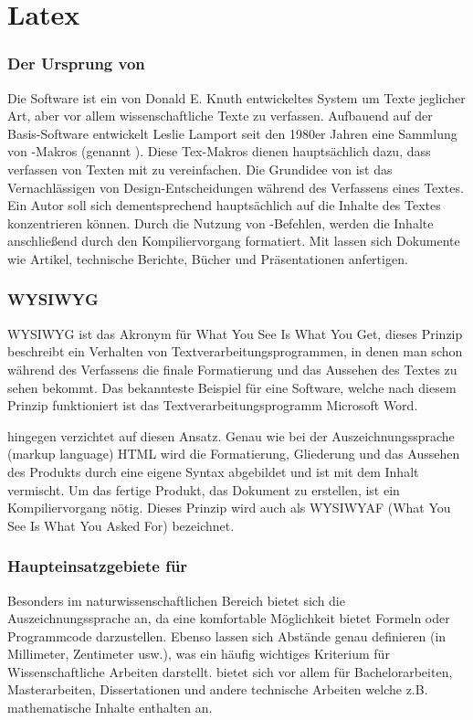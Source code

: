 \part{Latex}
    \section{Der Ursprung von \latex}
    Die Software \tex ist ein von Donald E. Knuth entwickeltes System um Texte jeglicher Art, aber vor allem wissenschaftliche Texte zu verfassen. Aufbauend auf der Basis-Software \tex entwickelt Leslie Lamport seit den 1980er Jahren eine Sammlung von \tex-Makros (genannt \latex). Diese Tex-Makros dienen hauptsächlich dazu, dass verfassen von Texten mit \tex zu vereinfachen. Die Grundidee von \latex ist das Vernachlässigen von Design-Entscheidungen während des Verfassens eines Textes. Ein Autor soll sich dementsprechend hauptsächlich auf die Inhalte des Textes konzentrieren können. Durch die Nutzung von \latex-Befehlen, werden die Inhalte anschließend durch den Kompiliervorgang formatiert. Mit \latex lassen sich Dokumente wie Artikel, technische Berichte, Bücher und Präsentationen anfertigen.

    \section{WYSIWYG}
    WYSIWYG ist das Akronym für What You See Is What You Get, dieses Prinzip beschreibt ein Verhalten von Textverarbeitungsprogrammen, in denen man schon während des Verfassens die finale Formatierung und das Aussehen des Textes zu sehen bekommt. Das bekannteste Beispiel für eine Software, welche nach diesem Prinzip funktioniert ist das Textverarbeitungsprogramm Microsoft Word.

    \tex hingegen verzichtet auf diesen Ansatz. Genau wie bei der Auszeichnungssprache (markup language) HTML wird die Formatierung, Gliederung und das Aussehen des Produkts durch eine eigene Syntax abgebildet und ist mit dem Inhalt vermischt. Um das fertige Produkt, das Dokument zu erstellen, ist ein Kompiliervorgang nötig. Dieses Prinzip wird auch als WYSIWYAF (What You See Is What You Asked For) bezeichnet.

    \section{Haupteinsatzgebiete für \tex}
    Besonders im naturwissenschaftlichen Bereich bietet sich die Auszeichnungssprache \tex an, da \tex eine komfortable Möglichkeit bietet Formeln oder Programmcode darzustellen. Ebenso lassen sich Abstände genau definieren (in Millimeter, Zentimeter usw.), was ein häufig wichtiges Kriterium für Wissenschaftliche Arbeiten darstellt. \tex bietet sich vor allem für Bachelorarbeiten, Masterarbeiten, Dissertationen und andere technische Arbeiten welche z.B. mathematische Inhalte enthalten an.

